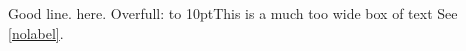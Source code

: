 \documentclass{article}
\begin{document}
Good line.
\undefinedmacro here.
Overfull: \hbox to 10pt{This is a much too wide box of text}
See \ref{nolabel}.
\end{document}
